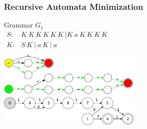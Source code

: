 \documentclass{beamer}
\begin{document}
	\begin{frame} 
		\frametitle{Recursive Automata Minimization}
		\vspace{-20pt}
		\begin{center}
			{Grammar $G_1$\\
			\vspace{10pt}
			$
			\begin{array}{rl}
			S :& K\ K\ K\ K\ K\ K \ |K\ a\ K\ K\ K\ K \\
			K :& S\ K\ |\ a\ K\ |\ a \\
			\end{array}
			$
			}\\
		    {
				\includegraphics[width=7cm]{pictures/G1initial.jpg}
			}\\
		    {
				\includegraphics[width=7cm]{pictures/G1automaton.pdf}
			}
		\end{center}

	\end{frame}
	\iffalse
\end{document}
